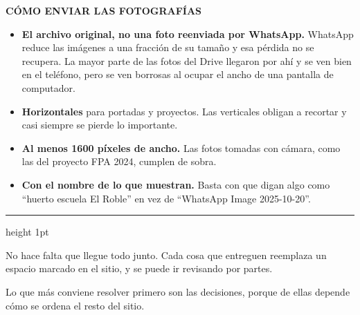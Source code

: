 \documentclass[11pt,a4paper]{article}
\begin{document}
\begin{tcolorbox}[
  colback=superficie, colframe=superficie,
  boxrule=0pt, arc=2pt, left=12pt, right=12pt, top=10pt, bottom=10pt
]
{\footnotesize\bfseries\color{tintasuave}CÓMO ENVIAR LAS FOTOGRAFÍAS}

\vspace{0.5em}
\small\color{tintasuave}
\begin{itemize}[leftmargin=1.1em, itemsep=0.5em, topsep=0pt]
  \item \textbf{\color{tinta}El archivo original, no una foto reenviada por
        WhatsApp.} WhatsApp reduce las imágenes a una fracción de su tamaño
        y esa pérdida no se recupera. La mayor parte de las fotos del Drive
        llegaron por ahí y se ven bien en el teléfono, pero se ven borrosas
        al ocupar el ancho de una pantalla de computador.
  \item \textbf{\color{tinta}Horizontales} para portadas y proyectos. Las
        verticales obligan a recortar y casi siempre se pierde lo importante.
  \item \textbf{\color{tinta}Al menos 1600 píxeles de ancho.} Las fotos
        tomadas con cámara, como las del proyecto FPA 2024, cumplen de sobra.
  \item \textbf{\color{tinta}Con el nombre de lo que muestran.} Basta con que
        digan algo como ``huerto escuela El Roble'' en vez de ``WhatsApp
        Image 2025-10-20''.
\end{itemize}
\end{tcolorbox}

\vspace{1.6em}
{\color{superficiealt}\hrule height 1pt}
\vspace{1em}

{\small\color{tintasuave}
No hace falta que llegue todo junto. Cada cosa que entreguen reemplaza un
espacio marcado en el sitio, y se puede ir revisando por partes.

Lo que más conviene resolver primero son las decisiones, porque de ellas
depende cómo se ordena el resto del sitio.\par}
\end{document}
